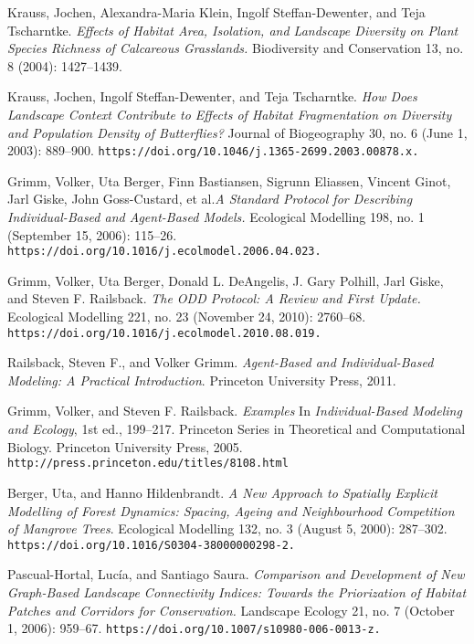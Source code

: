 \documentclass[11pt, a4paper]{article}
\begin{document}
\begin{thebibliography}{9}
 Krauss, Jochen, Alexandra-Maria Klein, Ingolf Steffan-Dewenter, and Teja Tscharntke. \textit{Effects of Habitat Area, Isolation, and Landscape Diversity on Plant Species Richness of Calcareous Grasslands.} Biodiversity and Conservation 13, no. 8 (2004): 1427–1439.


 Krauss, Jochen, Ingolf Steffan-Dewenter, and Teja Tscharntke. \textit{How Does Landscape Context Contribute to Effects of Habitat Fragmentation on Diversity and Population Density of Butterflies?} Journal of Biogeography 30, no. 6 (June 1, 2003): 889–900. \texttt{https://doi.org/10.1046/j.1365-2699.2003.00878.x.}


 Grimm, Volker, Uta Berger, Finn Bastiansen, Sigrunn Eliassen, Vincent Ginot, Jarl Giske, John Goss-Custard, et al.\textit{A Standard Protocol for Describing Individual-Based and Agent-Based Models.} Ecological Modelling 198, no. 1 (September 15, 2006): 115–26. \texttt{https://doi.org/10.1016/j.ecolmodel.2006.04.023.}

 Grimm, Volker, Uta Berger, Donald L. DeAngelis, J. Gary Polhill, Jarl Giske, and Steven F. Railsback. \textit{The ODD Protocol: A Review and First Update.} Ecological Modelling 221, no. 23 (November 24, 2010): 2760–68. \texttt{https://doi.org/10.1016/j.ecolmodel.2010.08.019.}

 Railsback, Steven F., and Volker Grimm. \textit{Agent-Based and Individual-Based Modeling: A Practical Introduction}. Princeton University Press, 2011.

 Grimm, Volker, and Steven F. Railsback. \textit{Examples} In \textit{Individual-Based Modeling and Ecology}, 1st ed., 199–217. Princeton Series in Theoretical and Computational Biology. Princeton University Press, 2005. \texttt{http://press.princeton.edu/titles/8108.html}

 Berger, Uta, and Hanno Hildenbrandt. \textit{A New Approach to Spatially Explicit Modelling of Forest Dynamics: Spacing, Ageing and Neighbourhood Competition of Mangrove Trees}. Ecological Modelling 132, no. 3 (August 5, 2000): 287–302. \texttt{https://doi.org/10.1016/S0304-38000000298-2.}

 Pascual-Hortal, Lucía, and Santiago Saura. \textit{Comparison and Development of New Graph-Based Landscape Connectivity Indices: Towards the Priorization of Habitat Patches and Corridors for Conservation.} Landscape Ecology 21, no. 7 (October 1, 2006): 959–67. \texttt{https://doi.org/10.1007/s10980-006-0013-z.}


\end{thebibliography}
\end{document}
